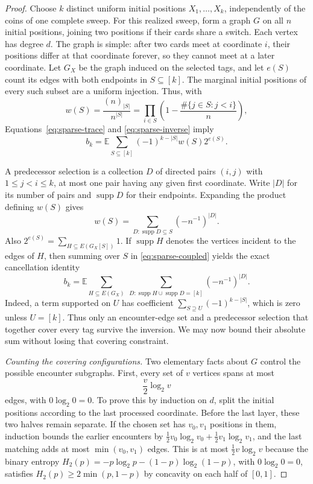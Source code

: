 \begin{proof}
Choose $k$ distinct uniform initial positions $X_1,\ldots,X_k$,
independently of the coins of one complete sweep. For this realized
sweep, form a graph $G$ on all $n$ initial positions, joining two
positions if their cards share a switch. Each vertex has degree $d$.
The graph is simple: after two cards meet at coordinate $i$, their
positions differ at that coordinate forever, so they cannot meet at a
later coordinate. Let $G_X$ be the graph induced on the selected tags,
and let $e(S)$ count its edges with both endpoints in $S\subseteq[k]$.
The marginal initial positions of every such subset are a uniform
injection. Thus, with
\[
 w(S)=\frac{(n)_{|S|}}{n^{|S|}}
     =\prod_{i\in S}\left(1-
             \frac{\#\{j\in S:j<i\}}n\right),
\]
Equations~\eqref{eq:sparse-trace} and \eqref{eq:sparse-inverse} imply
\begin{equation}
\label{eq:sparse-coupled}
 b_k=\mathbb E\sum_{S\subseteq[k]}
             (-1)^{k-|S|}w(S)2^{e(S)}.
\end{equation}

A predecessor selection is a collection $D$ of directed pairs
$(i,j)$ with $1\le j<i\le k$, at most one pair having any given
first coordinate. Write $|D|$ for its number of pairs and
$\operatorname{supp}D$ for their endpoints. Expanding the product
defining $w(S)$ gives
\[
 w(S)=\sum_{D:\operatorname{supp}D\subseteq S}
                         (-n^{-1})^{|D|}.
\]
Also $2^{e(S)}=\sum_{H\subseteq E(G_X[S])}1$. If
$\operatorname{supp}H$ denotes the vertices incident to the edges
of $H$, then summing over $S$ in \eqref{eq:sparse-coupled} yields the
exact cancellation identity
\begin{equation}
\label{eq:sparse-cover}
 b_k=\mathbb E\sum_{H\subseteq E(G_X)}\ 
       \sum_{D:\operatorname{supp}H\cup\operatorname{supp}D=[k]}
                     (-n^{-1})^{|D|}.
\end{equation}
Indeed, a term supported on $U$ has coefficient
$\sum_{S\supseteq U}(-1)^{k-|S|}$, which is zero unless $U=[k]$.
Thus only an encounter-edge set and a predecessor selection that
together cover every tag survive the inversion. We may now bound their
absolute sum without losing that covering constraint.

\medskip\noindent
\emph{Counting the covering configurations.}
Two elementary facts about $G$ control the possible encounter
subgraphs. First, every set of $v$ vertices spans at most
\begin{equation}
\label{eq:sparse-edge-count}
 \frac v2\log_2v
\end{equation}
edges, with $0\log_2 0=0$. To prove this by induction on $d$, split
the initial positions according to the last processed coordinate.
Before the last layer, these two halves remain separate. If the
chosen set has $v_0,v_1$ positions in them, induction bounds the
earlier encounters by
$\tfrac12v_0\log_2v_0+\tfrac12v_1\log_2v_1$, and the last matching
adds at most $\min(v_0,v_1)$ edges. This is at most
$\tfrac12v\log_2v$ because the binary entropy
$H_2(p)=-p\log_2p-(1-p)\log_2(1-p)$, with $0\log_2 0=0$, satisfies
$H_2(p)\ge2\min(p,1-p)$ by concavity on each half of $[0,1]$.


\end{proof}
